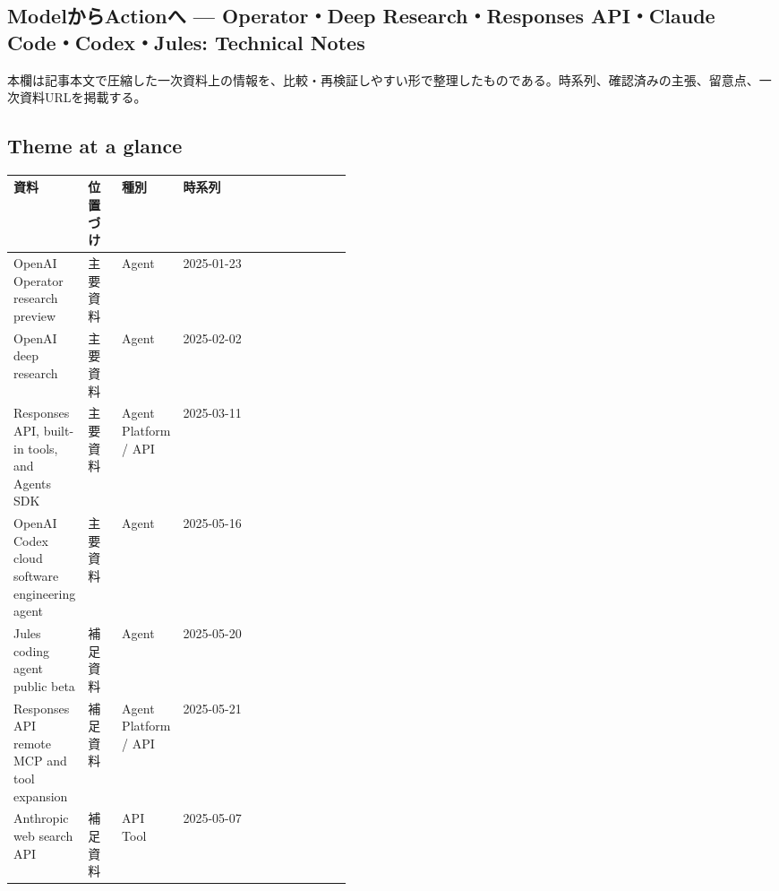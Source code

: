 \subsection*{ModelからActionへ — Operator・Deep Research・Responses API・Claude Code・Codex・Jules: Technical Notes}
本欄は記事本文で圧縮した一次資料上の情報を、比較・再検証しやすい形で整理したものである。時系列、確認済みの主張、留意点、一次資料URLを掲載する。
\medskip
\subsection*{Theme at a glance}
\begin{center}
\footnotesize
\begin{tabularx}{\linewidth}{@{}p{0.20\linewidth}p{0.10\linewidth}p{0.14\linewidth}X@{}}
\toprule
資料 & 位置づけ & 種別 & 時系列 \\
\midrule
OpenAI Operator research preview & 主要資料 & Agent & 2025-01-23   \\
OpenAI deep research & 主要資料 & Agent & 2025-02-02   \\
Responses API, built-in tools, and Agents SDK & 主要資料 & Agent Platform / API & 2025-03-11   \\
OpenAI Codex cloud software engineering agent & 主要資料 & Agent & 2025-05-16   \\
Jules coding agent public beta & 補足資料 & Agent & 2025-05-20   \\
Responses API remote MCP and tool expansion & 補足資料 & Agent Platform / API & 2025-05-21   \\
Anthropic web search API & 補足資料 & API Tool & 2025-05-07   \\
\bottomrule
\end{tabularx}
\end{center}
\normalsize


